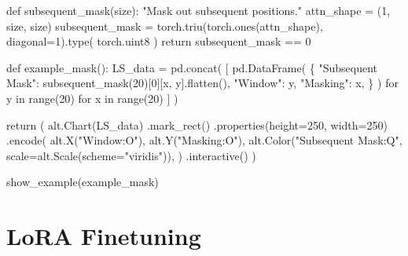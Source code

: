 \documentclass[
  letterpaper,
  DIV=11,
  numbers=noendperiod]{scrreprt}
\newenvironment{Shaded}{\begin{snugshade}}{\end{snugshade}}
\newcommand{\BuiltInTok}[1]{\textcolor[rgb]{0.00,0.23,0.31}{#1}}
\newcommand{\CommentTok}[1]{\textcolor[rgb]{0.37,0.37,0.37}{#1}}
\newcommand{\ControlFlowTok}[1]{\textcolor[rgb]{0.00,0.23,0.31}{#1}}
\newcommand{\DecValTok}[1]{\textcolor[rgb]{0.68,0.00,0.00}{#1}}
\newcommand{\KeywordTok}[1]{\textcolor[rgb]{0.00,0.23,0.31}{#1}}
\newcommand{\NormalTok}[1]{\textcolor[rgb]{0.00,0.23,0.31}{#1}}
\newcommand{\OperatorTok}[1]{\textcolor[rgb]{0.37,0.37,0.37}{#1}}
\newcommand{\StringTok}[1]{\textcolor[rgb]{0.13,0.47,0.30}{#1}}
\begin{document}
\begin{Shaded}
\begin{Highlighting}[]
  \KeywordTok{def}\NormalTok{ subsequent\_mask(size):}
    \CommentTok{"Mask out subsequent positions."}
\NormalTok{    attn\_shape }\OperatorTok{=}\NormalTok{ (}\DecValTok{1}\NormalTok{, size, size)}
\NormalTok{    subsequent\_mask }\OperatorTok{=}\NormalTok{ torch.triu(torch.ones(attn\_shape), diagonal}\OperatorTok{=}\DecValTok{1}\NormalTok{).}\BuiltInTok{type}\NormalTok{(}
\NormalTok{        torch.uint8}
\NormalTok{    )}
    \ControlFlowTok{return}\NormalTok{ subsequent\_mask }\OperatorTok{==} \DecValTok{0}


\KeywordTok{def}\NormalTok{ example\_mask():}
\NormalTok{    LS\_data }\OperatorTok{=}\NormalTok{ pd.concat(}
\NormalTok{        [}
\NormalTok{            pd.DataFrame(}
\NormalTok{                \{}
                    \StringTok{"Subsequent Mask"}\NormalTok{: subsequent\_mask(}\DecValTok{20}\NormalTok{)[}\DecValTok{0}\NormalTok{][x, y].flatten(),}
                    \StringTok{"Window"}\NormalTok{: y,}
                    \StringTok{"Masking"}\NormalTok{: x,}
\NormalTok{                \}}
\NormalTok{            )}
            \ControlFlowTok{for}\NormalTok{ y }\KeywordTok{in} \BuiltInTok{range}\NormalTok{(}\DecValTok{20}\NormalTok{)}
            \ControlFlowTok{for}\NormalTok{ x }\KeywordTok{in} \BuiltInTok{range}\NormalTok{(}\DecValTok{20}\NormalTok{)}
\NormalTok{        ]}
\NormalTok{    )}

    \ControlFlowTok{return}\NormalTok{ (}
\NormalTok{        alt.Chart(LS\_data)}
\NormalTok{        .mark\_rect()}
\NormalTok{        .properties(height}\OperatorTok{=}\DecValTok{250}\NormalTok{, width}\OperatorTok{=}\DecValTok{250}\NormalTok{)}
\NormalTok{        .encode(}
\NormalTok{            alt.X(}\StringTok{"Window:O"}\NormalTok{),}
\NormalTok{            alt.Y(}\StringTok{"Masking:O"}\NormalTok{),}
\NormalTok{            alt.Color(}\StringTok{"Subsequent Mask:Q"}\NormalTok{, scale}\OperatorTok{=}\NormalTok{alt.Scale(scheme}\OperatorTok{=}\StringTok{"viridis"}\NormalTok{)),}
\NormalTok{        )}
\NormalTok{        .interactive()}
\NormalTok{    )}


\NormalTok{show\_example(example\_mask)}
\end{Highlighting}
\end{Shaded}


\chapter{LoRA Finetuning}\label{lora-finetuning}
\end{document}
